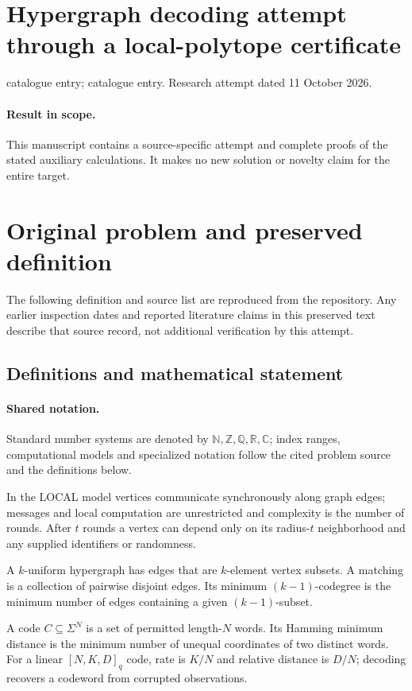 \documentclass[11pt]{article}
\begin{document}
\section*{Hypergraph decoding attempt through a local-polytope certificate}
\noindent catalogue entry; catalogue entry. Research attempt dated 11 October 2026.
\paragraph{Result in scope.}This manuscript contains a source-specific attempt and complete proofs of the stated auxiliary calculations. It makes no new solution or novelty claim for the entire target.
\section{Original problem and preserved definition}
The following definition and source list are reproduced from the repository. Any earlier inspection dates and reported literature claims in this preserved text describe that source record, not additional verification by this attempt.
\subsection{Definitions and mathematical statement}

\paragraph{Shared notation.}Standard number systems are denoted by $\mathbb N,\mathbb Z,\mathbb Q,\mathbb R,\mathbb C$; index ranges, computational models and specialized notation follow the cited problem source and the definitions below.


In the LOCAL model vertices communicate synchronously along graph edges; messages and local computation are unrestricted and complexity is the number of rounds. After $t$ rounds a vertex can depend only on its radius-$t$ neighborhood and any supplied identifiers or randomness.

A $k$-uniform hypergraph has edges that are $k$-element vertex subsets. A matching is a collection of pairwise disjoint edges. Its minimum $(k-1)$-codegree is the minimum number of edges containing a given $(k-1)$-subset.

A code $C\subseteq\Sigma^N$ is a set of permitted length-$N$ words. Its Hamming minimum distance is the minimum number of unequal coordinates of two distinct words. For a linear $[N,K,D]_q$ code, rate is $K/N$ and relative distance is $D/N$; decoding recovers a codeword from corrupted observations.
\end{document}
